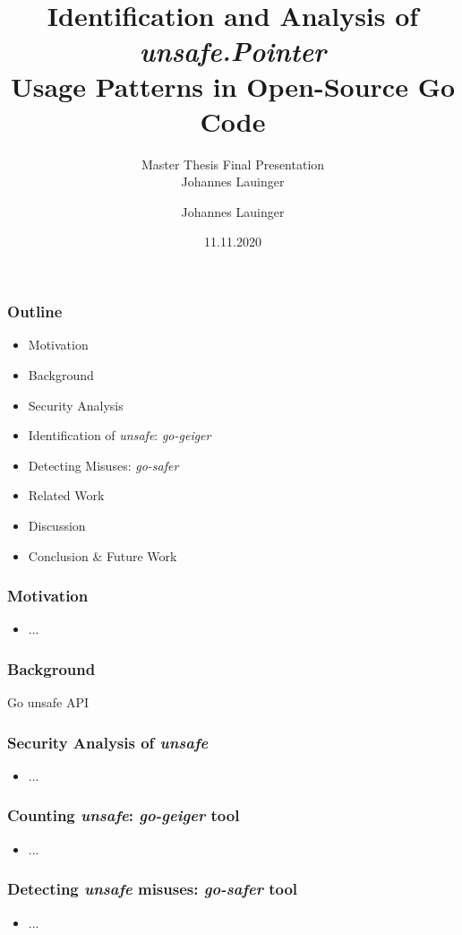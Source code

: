 \documentclass[
	english,
	color={accentcolor=9c},
	logo=true,
	colorframetitle=false
]{../../styles/tuda-ci/tudabeamer}
\title{Identification and Analysis of \textit{unsafe.Pointer}\\ Usage Patterns in Open-Source Go Code}
\subtitle{Master Thesis Final Presentation\\ Johannes Lauinger}
\author{Johannes Lauinger}
\institute{Software Technology Group}
\date{11.11.2020}
\begin{document}
	\maketitle

	\begin{frame}
		\frametitle{Outline}
		\begin{itemize}
			\setlength\itemsep{1em}
			\item Motivation
			\item Background
			\item Security Analysis
			\item Identification of \textit{unsafe}: \textit{go-geiger}
			\item Detecting Misuses: \textit{go-safer}
			\item Related Work
			\item Discussion
			\item Conclusion \& Future Work
		\end{itemize}
	\end{frame}


	\begin{frame}
		\frametitle{Motivation}
		\begin{itemize}
			\setlength\itemsep{1em}
			\item ...
		\end{itemize}
	\end{frame}


	\begin{frame}
		\frametitle{Background}
		\begin{centering}
			Go unsafe API
		\end{centering}
	\end{frame}


	\begin{frame}
		\frametitle{Security Analysis of \textit{unsafe}}
		\begin{itemize}
			\setlength\itemsep{1em}
			\item ...
		\end{itemize}
	\end{frame}


	\begin{frame}
		\frametitle{Counting \textit{unsafe}: \textit{go-geiger} tool}
		\begin{itemize}
			\setlength\itemsep{1em}
			\item ...
		\end{itemize}
	\end{frame}


	\begin{frame}
		\frametitle{Detecting \textit{unsafe} misuses: \textit{go-safer} tool}
		\begin{itemize}
			\setlength\itemsep{1em}
			\item ...
		\end{itemize}
	\end{frame}
\end{document}
